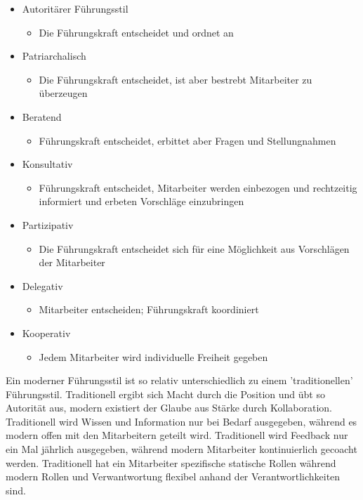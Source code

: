 \documentclass{article}
\begin{document}
	 \begin{itemize}
	 	\item{Autoritärer Führungsstil}
	 	\begin{itemize}
	 		\item{Die Führungskraft entscheidet und ordnet an}
	 	\end{itemize}
	 	\item{Patriarchalisch}
	 	\begin{itemize}
	 		\item{Die Führungskraft entscheidet, ist aber bestrebt Mitarbeiter zu überzeugen}
	 	\end{itemize}
	 	\item{Beratend}
	 	\begin{itemize}
	 		\item{Führungskraft entscheidet, erbittet aber Fragen und Stellungnahmen}
	 	\end{itemize}
	 	\item{Konsultativ}
	 	\begin{itemize}
	 		\item{Führungskraft entscheidet, Mitarbeiter werden einbezogen und rechtzeitig informiert und erbeten Vorschläge einzubringen}
	 	\end{itemize}
	 	\item{Partizipativ}
	 	\begin{itemize}
	 		\item{Die Führungskraft entscheidet sich für eine Möglichkeit aus Vorschlägen der Mitarbeiter}
	 	\end{itemize}
	 	\item{Delegativ}
	 	\begin{itemize}
	 		\item{Mitarbeiter entscheiden; Führungskraft koordiniert}
	 	\end{itemize}
	 	\item{Kooperativ}
	 	\begin{itemize}
	 		\item{Jedem Mitarbeiter wird individuelle Freiheit gegeben}
	 	\end{itemize}
	 \end{itemize}
	 Ein moderner Führungsstil ist so relativ unterschiedlich zu einem 'traditionellen' Führungsstil. Traditionell ergibt sich Macht durch die Position und übt so Autorität aus, modern existiert der Glaube aus Stärke durch Kollaboration. Traditionell wird Wissen und Information nur bei Bedarf ausgegeben, während es modern offen mit den Mitarbeitern geteilt wird. Traditionell wird Feedback nur ein Mal jährlich ausgegeben, während modern Mitarbeiter kontinuierlich gecoacht werden. Traditionell hat ein Mitarbeiter spezifische statische Rollen während modern Rollen und Verwantwortung flexibel anhand der Verantwortlichkeiten sind.
\end{document}
